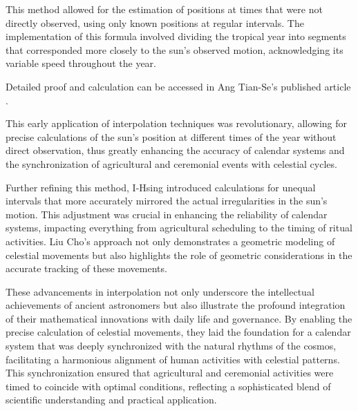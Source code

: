 \documentclass[10pt]{article}
\begin{document}
\vspace{7pt}

This method allowed for the estimation of positions at times that were not directly observed, using only known positions at regular intervals. The implementation of this formula involved dividing the tropical year into segments that corresponded more closely to the sun's observed motion, acknowledging its variable speed throughout the year. 

\vspace{7pt}

Detailed proof and calculation can be accessed in Ang Tian-Se's published article \autocite[p.137 to p.146]{Ang}.

\vspace{7pt}

This early application of interpolation techniques was revolutionary, allowing for precise calculations of the sun's position at different times of the year without direct observation, thus greatly enhancing the accuracy of calendar systems and the synchronization of agricultural and ceremonial events with celestial cycles.

\vspace{7pt}

Further refining this method, I-Hsing introduced calculations for unequal intervals that more accurately mirrored the actual irregularities in the sun’s motion. This adjustment was crucial in enhancing the reliability of calendar systems, impacting everything from agricultural scheduling to the timing of ritual activities. Liu Cho's approach not only demonstrates a geometric modeling of celestial movements but also highlights the role of geometric considerations in the accurate tracking of these movements.

\vspace{7pt}

These advancements in interpolation not only underscore the intellectual achievements of ancient astronomers but also illustrate the profound integration of their mathematical innovations with daily life and governance. By enabling the precise calculation of celestial movements, they laid the foundation for a calendar system that was deeply synchronized with the natural rhythms of the cosmos, facilitating a harmonious alignment of human activities with celestial patterns. This synchronization ensured that agricultural and ceremonial activities were timed to coincide with optimal conditions, reflecting a sophisticated blend of scientific understanding and practical application.
\end{document}
